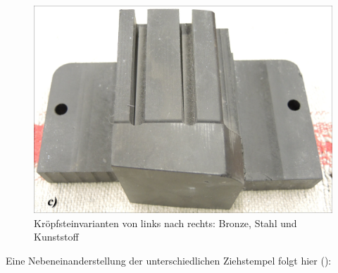 \documentclass[12pt,a4paper,parskip]{scrartcl}
\begin{document}
\begin{figure}[H]
\begin{minipage} [t]{0.3115\textwidth}
\includegraphics[width=.9\textwidth]{diekunst}

\end{minipage}
\caption{Kröpfsteinvarianten von links nach rechts: Bronze, Stahl und Kunststoff}
\label{fig:dievar}
\end{figure}


Eine Nebeneinanderstellung der unterschiedlichen Ziehstempel folgt hier (): 
\end{document}
